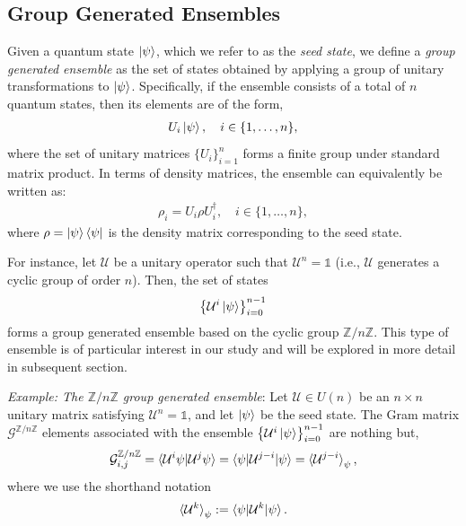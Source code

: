 \documentclass[12pt,letterpaper]{article}
\begin{document}
\begin{multicols}{2}
\subsection{Group Generated Ensembles}\label{sectionGroupGeneratedEnsemble}

Given a quantum state $\ket{\psi}$, which we refer to as the \emph{seed state}, we define a \emph{group generated ensemble} as the set of states obtained by applying a group of unitary transformations to $\ket{\psi}$. Specifically, if the ensemble consists of a total of $n$ quantum states, then its elements are of the form,
\begin{align*}
	U_i\ket{\psi}, \quad i \in \{1, \dots, n\},
\end{align*}
where the set of unitary matrices $\{U_i\}_{i=1}^n$ forms a finite group under standard matrix product. In terms of density matrices, the ensemble can equivalently be written as:
\begin{align*}
	\rho_i = U_i \rho U_i^\dagger, \quad i \in \{1, \dots, n\},
\end{align*}
where $\rho = \ket{\psi}\bra{\psi}$ is the density matrix corresponding to the seed state.

For instance, let $\mathcal{U}$ be a unitary operator such that $\mathcal{U}^n = \mathds{1}$ (i.e., $\mathcal{U}$ generates a cyclic group of order $n$). Then, the set of states
\begin{align*}
	\left\{ \mathcal{U}^i\ket{\psi} \right\}_{i=0}^{n-1}
\end{align*}
forms a group generated ensemble based on the cyclic group $\mathbb{Z}/n\mathbb{Z}$. This type of ensemble is of particular interest in our study and will be explored in more detail in subsequent section.

\emph{Example: The $\mathbb{Z}/n\mathbb{Z}$ group generated ensemble}: Let $\mathcal{U} \in U(n)$ be an $n \times n$ unitary matrix satisfying $\mathcal{U}^n = \mathds{1}$, and let $\ket{\psi}$ be the seed state. The Gram matrix $\mathcal{G}^{\mathbb{Z}/n\mathbb{Z}}$ elements associated with the ensemble $\left\{\mathcal{U}^i\ket{\psi}\right\}_{i=0}^{n-1}$ are nothing but,
\begin{align*}
	\mathcal{G}^{\mathbb{Z}/n\mathbb{Z}}_{i,j} = \braket{\mathcal{U}^i\psi | \mathcal{U}^j\psi} = \braket{\psi | \mathcal{U}^{j-i} | \psi} = \braket{\mathcal{U}^{j-i}}_{\psi},
\end{align*}
where we use the shorthand notation
\begin{align*}
	\braket{\mathcal{U}^k}_\psi := \braket{\psi | \mathcal{U}^k | \psi}.
\end{align*}


\end{multicols}
\end{document}
